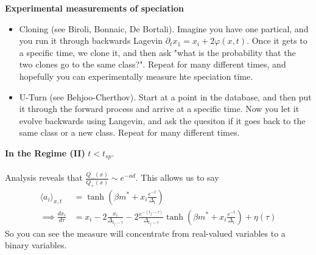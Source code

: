 \begin{sidework}
	\textbf{Experimental measurements of speciation}
	\begin{itemize}
	\item Cloning (see Biroli, Bonnaic, De Bortali). Imagine you have one partical, and you run it through backwards Lagevin $\partial_t x_1 = x_i + 2 \varphi(x,t)$. Once it gets to a specific time, we clone it, and then ask "what is the probability that the two clones go to the same class?". Repeat for many different times, and hopefully you can experimentally measure hte speciation time.
	\item U-Turn (see Behjoo-Cherthov). Start at a point in the database, and then put it through the forward process and arrive at a specific time. Now you let it evolve backwards using Langevin, and ask the quesiton if it goes back to the same class or a new class. Repeat for many different times.
\end{itemize}
\end{sidework}
\textbf{In the Regime (II)} $t < t_{sp}$. \\
\\
Analysis reveals that $\frac{Q_-(x)}{Q_+(x)} \sim e^{- a d}$. This allows us to say
\begin{align}
	\langle a_i \rangle_{x,t} & = \tanh \left(\beta m^* + x_i \frac{e^{-t}}{\Delta_t} \right)\\
	\implies \frac{dx_i}{d\tau} & = x_i - 2 \frac{x_i}{\Delta_{t_f - \tau}} -2 \frac{e^{-(t_f-\tau)}}{\Delta_{t_f - \tau}} \tanh \left(\beta m^* + x_i \frac{e^{-t}}{\Delta_t} \right) + \eta(\tau)
\end{align}
So you can see the measure will concentrate from real-valued variables to a binary variables.

